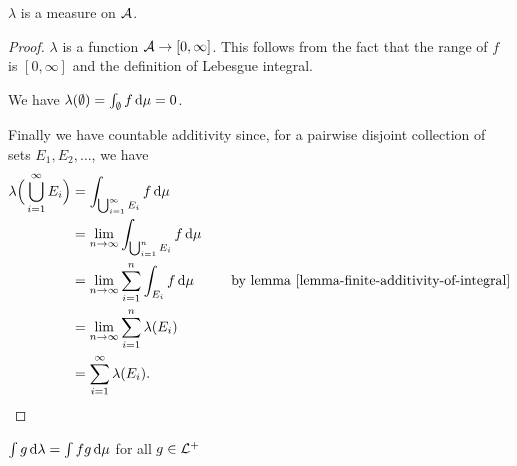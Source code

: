 \begin{claim*}
  $\lambda$ is a measure on $\mathcal A$.
\end{claim*}
\begin{proof}
  $\lambda$ is a function $\mathcal A \to [0, \infty]$. This follows from the fact that the range of $f$
  is $[0, \infty]$ and the definition of Lebesgue integral.

  We have $\lambda(\emptyset) = \int_\emptyset f \d\mu = 0$.

  Finally we have countable additivity since, for a pairwise disjoint collection of sets $E_1, E_2, \ldots$, we
  have
  \begin{align*}
    \lambda\Big(\bigcup_{i=1}^\infty E_i\Big)
    &= \int_{\bigcup_{i=1}^\infty E_i} f \d\mu \\
    &= \lim_{n\to\infty}\int_{\bigcup_{i=1}^n E_i} f \d\mu \\
    &= \lim_{n\to\infty}\sum_{i=1}^n \int_{E_i} f \d\mu ~~~~~~~\text{~by lemma \eqref{lemma-finite-additivity-of-integral}}\\
    &= \lim_{n\to\infty}\sum_{i=1}^n \lambda(E_i) \\
    &= \sum_{i=1}^\infty \lambda(E_i).
  \end{align*}
\end{proof}

\begin{claim*}
  $\int g \d\lambda = \int f g \d\mu$ for all $g \in \mathcal L^+$
\end{claim*}

